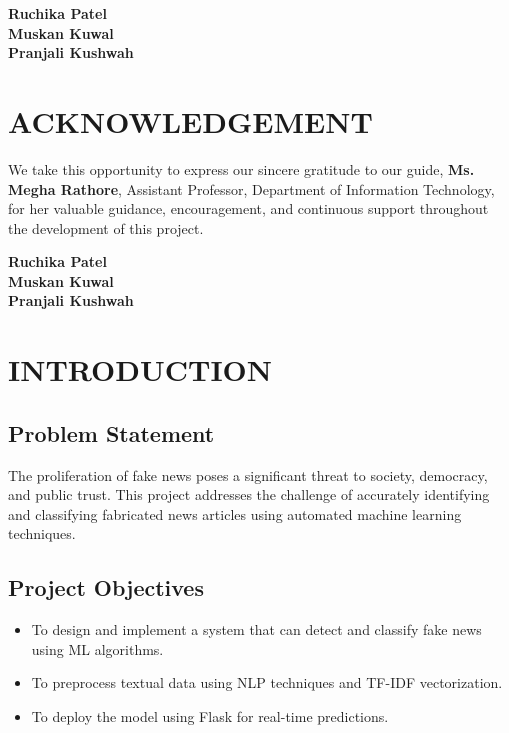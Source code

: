 \documentclass[12pt,a4paper]{report}
\begin{document}
\vspace{1cm}
\begin{flushright}
\textbf{Ruchika Patel}\\
\textbf{Muskan Kuwal}\\
\textbf{Pranjali Kushwah}
\end{flushright}

\chapter*{ACKNOWLEDGEMENT}
We take this opportunity to express our sincere gratitude to our guide, \textbf{Ms. Megha Rathore}, Assistant Professor, Department of Information Technology, for her valuable guidance, encouragement, and continuous support throughout the development of this project.

\begin{flushright}
\textbf{Ruchika Patel}\\
\textbf{Muskan Kuwal}\\
\textbf{Pranjali Kushwah}
\end{flushright}
\newpage
\tableofcontents
\newpage
\chapter{INTRODUCTION}
\label{chap:introduction}
\section{Problem Statement}
The proliferation of fake news poses a significant threat to society, democracy, and public trust. This project addresses the challenge of accurately identifying and classifying fabricated news articles using automated machine learning techniques.

\section{Project Objectives}
\begin{itemize}
\item To design and implement a system that can detect and classify fake news using ML algorithms.
\item To preprocess textual data using NLP techniques and TF-IDF vectorization.
\item To deploy the model using Flask for real-time predictions.
\end{itemize}
\end{document}
